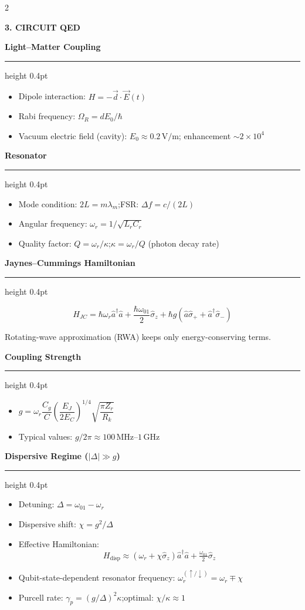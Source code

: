 \documentclass[10pt,a4paper]{article}
\newcommand{\sectionbox}[1]{%
  \vspace{3pt}%
  \noindent\colorbox{headerbg}{\parbox{\linewidth-2\fboxsep}%
    {\bfseries\small\color{white}\MakeUppercase{#1}}}%
  \vspace{1pt}%
}
\newcommand{\subsec}[1]{%
  \vspace{3pt}%
  {\small\bfseries\color{subseccolor}#1}%
  \vspace{1pt}\hrule height 0.4pt \vspace{2pt}%
}
\begin{document}
\begin{multicols}{2}
\sectionbox{3. Circuit QED}

\subsec{Light–Matter Coupling}
\begin{itemize}
  \item Dipole interaction: $H=-\vec d\cdot\vec E(t)$
  \item Rabi frequency: $\Omega_R=dE_0/\hbar$
  \item Vacuum electric field (cavity): $E_0\approx0.2\,\text{V/m}$; enhancement $\sim2\times10^4$
\end{itemize}

\subsec{Resonator}
\begin{itemize}
  \item Mode condition: $2L=m\lambda_m$;\quad FSR: $\Delta f=c/(2L)$
  \item Angular frequency: $\omega_r=1/\sqrt{L_rC_r}$
  \item Quality factor: $Q=\omega_r/\kappa$;\quad $\kappa=\omega_r/Q$ (photon decay rate)
\end{itemize}

\subsec{Jaynes–Cummings Hamiltonian}
\begin{formulabox}
\[
H_{JC}=\hbar\omega_r\hat a^\dagger\hat a
      +\frac{\hbar\omega_{01}}{2}\hat\sigma_z
      +\hbar g(\hat a\hat\sigma_++\hat a^\dagger\hat\sigma_-)
\]
\end{formulabox}
Rotating-wave approximation (RWA) keeps only energy-conserving terms.

\subsec{Coupling Strength}
\begin{itemize}
  \item $g=\omega_r\dfrac{C_g}{C}\!\left(\dfrac{E_J}{2E_C}\right)^{\!1/4}\!\sqrt{\dfrac{\pi Z_r}{R_k}}$
  \item Typical values: $g/2\pi\approx100\,\text{MHz}$–$1\,\text{GHz}$
\end{itemize}

\subsec{Dispersive Regime ($|\Delta|\gg g$)}
\begin{itemize}
  \item Detuning: $\Delta=\omega_{01}-\omega_r$
  \item Dispersive shift: $\chi=g^2/\Delta$
  \item Effective Hamiltonian:
  \[H_\text{disp}\approx(\omega_r+\chi\hat\sigma_z)\hat a^\dagger\hat a+\tfrac{\omega_{01}}{2}\hat\sigma_z\]
  \item Qubit-state-dependent resonator frequency: $\omega_r^{(\uparrow/\downarrow)}=\omega_r\mp\chi$
  \item Purcell rate: $\gamma_p=(g/\Delta)^2\kappa$;\quad optimal: $\chi/\kappa\approx1$
\end{itemize}


\end{multicols}
\end{document}
